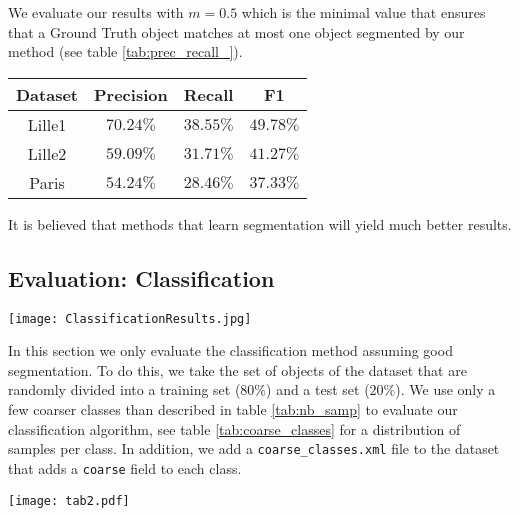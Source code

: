 \documentclass[a4paper, 10pt, journal]{article}
\begin{document}
We evaluate our results with $m=0.5$ which is the minimal value that ensures that a Ground Truth object matches at most one object segmented by our method (see table \ref{tab:prec_recall_}).

\begin{center}
 \sf\centering
 \begin{tabular}{cccc}
 \toprule
  Dataset & Precision & Recall & F1 \\
 \midrule
   Lille1  & $70.24 \%$ & $38.55 \%$ & $49.78 \%$\\
   Lille2  & $59.09 \%$ & $31.71 \%$ & $41.27 \%$\\
   Paris   & $54.24 \%$ & $28.46 \%$ & $37.33 \%$\\
 \bottomrule
 \end{tabular}
\end{center}

It is believed that methods that learn segmentation will yield much better results.

\subsection{Evaluation: Classification}

\begin{center}\centering
 \texttt{[image: ClassificationResults.jpg]}
\end{center}

In this section we only evaluate the classification method assuming good segmentation. To do this, we take the set of objects of the dataset that are randomly divided into a training set ($80\%$) and a test set ($20\%$).
We use only a few coarser classes than described in table \ref{tab:nb_samp} to evaluate our classification algorithm, see table \ref{tab:coarse_classes} for a distribution of samples per class. In addition, we add a \texttt{coarse\_classes.xml} file to the dataset that adds a \texttt{coarse} field to each class.

\begin{center}
 \texttt{[image: tab2.pdf]}
\end{center}
\end{document}
